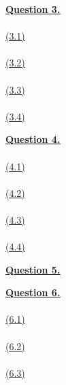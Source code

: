 \documentclass[12pt]{article}
\begin{document}
\hyperlink{toc}{\LARGE \underline{\textbf{Question 3.}}}\\
~\\\hyperlink{toc}{\hypertarget{3.1}{(3.1)}}\\
~\\\hyperlink{toc}{\hypertarget{3.2}{(3.2)}}\\
~\\\hyperlink{toc}{\hypertarget{3.3}{(3.3)}}\\
~\\\hyperlink{toc}{\hypertarget{3.4}{(3.4)}}\\
\newpage

\hyperlink{toc}{\LARGE \underline{\textbf{Question 4.}}}\\
~\\\hyperlink{toc}{\hypertarget{4.1}{(4.1)}}\\
~\\\hyperlink{toc}{\hypertarget{4.2}{(4.2)}}\\
~\\\hyperlink{toc}{\hypertarget{4.3}{(4.3)}}\\
~\\\hyperlink{toc}{\hypertarget{4.4}{(4.4)}}\\
\newpage

\hyperlink{toc}{\hypertarget{5}{\LARGE \underline{\textbf{Question 5.}}}}\\
\newpage

\hyperlink{toc}{\LARGE \underline{\textbf{Question 6.}}}\\
~\\\hyperlink{toc}{\hypertarget{6.1}{(6.1)}}\\
~\\\hyperlink{toc}{\hypertarget{6.2}{(6.2)}}\\
~\\\hyperlink{toc}{\hypertarget{6.3}{(6.3)}}\\
\newpage
\end{document}
